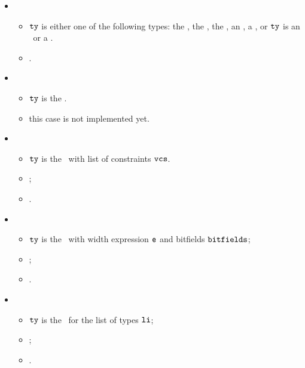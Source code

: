 \ProseParagraph
\OneApplies
\begin{itemize}
  \item {}
  \begin{itemize}
    \item $\tty$ is either one of the following types: the \realtypeterm, the \stringtypeterm,
          the \booleantypeterm, an \enumerationtypeterm, a \namedtypeterm,
          or $\tty$ is an \unconstrainedintegertype\ or a
          \pendingconstrainedintegertype.
    \item \Proseeqdef{$\newty$}{$\tty$}.
  \end{itemize}

  \item {}
  \begin{itemize}
    \item $\tty$ is the \parameterizedintegertype.
    \item this case is not implemented yet.
  \end{itemize}

  \item {}
  \begin{itemize}
    \item $\tty$ is the \wellconstrainedintegertype\ with list of constraints $\texttt{vcs}$.
    \item {};
    \item {}.
  \end{itemize}

  \item {}
  \begin{itemize}
    \item $\tty$ is the \bitvectortypeterm\ with width expression $\ve$ and bitfields $\texttt{bitfields}$;
    \item \Proserenamelocalsexpr{$\ve$}{$\vep$};
    \item {}.
  \end{itemize}

  \item {}
  \begin{itemize}
    \item $\tty$ is the \tupletypeterm\ for the list of types $\texttt{li}$;
    \item {};
    \item {}.
  \end{itemize}


\end{itemize}
